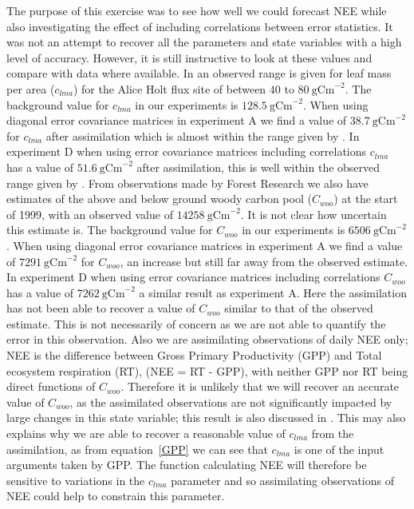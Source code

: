 \documentclass[review]{elsarticle}
\begin{document}
The purpose of this exercise was to see how well we could forecast NEE while also investigating the effect of including correlations between error statistics. It was not an attempt to recover all the parameters and state variables with a high level of accuracy. However, it is still instructive to look at these values and compare with data where available. In \citet{meir2002acclimation} an observed range is given for leaf mass per area ($c_{lma}$) for the Alice Holt flux site of between $40$ to $80 ~\text{gCm}^{-2}$. The background value for $c_{lma}$ in our experiments is $128.5 ~\text{gCm}^{-2}$. When using diagonal error covariance matrices in experiment A we find a value of $38.7~\text{gCm}^{-2}$ for $c_{lma}$ after assimilation which is almost within the range given by \citet{meir2002acclimation}. In experiment D when using error covariance matrices including correlations $c_{lma}$ has a value of $51.6~\text{gCm}^{-2}$ after assimilation, this is well within the observed range given by \citet{meir2002acclimation}. From observations made by Forest Research we also have estimates of the above and below ground woody carbon pool ($C_{woo}$) at the start of 1999, with an observed value of $14258~\text{gCm}^{-2}$. It is not clear how uncertain this estimate is. The background value for $C_{woo}$ in our experiments is $6506~\text{gCm}^{-2}$. When using diagonal error covariance matrices in experiment A we find a value of $7291~\text{gCm}^{-2}$ for $C_{woo}$, an increase but still far away from the observed estimate. In experiment D when using error covariance matrices including correlations $C_{woo}$ has a value of $7262~\text{gCm}^{-2}$ a similar result as experiment A. Here the assimilation has not been able to recover a value of $C_{woo}$ similar to that of the observed estimate. This is not necessarily of concern as we are not able to quantify the error in this observation. Also we are assimilating observations of daily NEE only; NEE is the difference between Gross Primary Productivity (GPP) and Total ecosystem respiration (RT), (NEE = RT - GPP), with neither GPP nor RT being direct functions of $C_{woo}$. Therefore it is unlikely that we will recover an accurate value of $C_{woo}$, as the assimilated observations are not significantly impacted by large changes in this state variable; this result is also discussed in \citet{fox2009reflex}. This may also explains why we are able to recover a reasonable value of $c_{lma}$ from the assimilation, as from equation~\eqref{GPP} we can see that $c_{lma}$ is one of the input arguments taken by GPP. The function calculating NEE will therefore be sensitive to variations in the $c_{lma}$ parameter and so assimilating observations of NEE could help to constrain this parameter.
\end{document}
